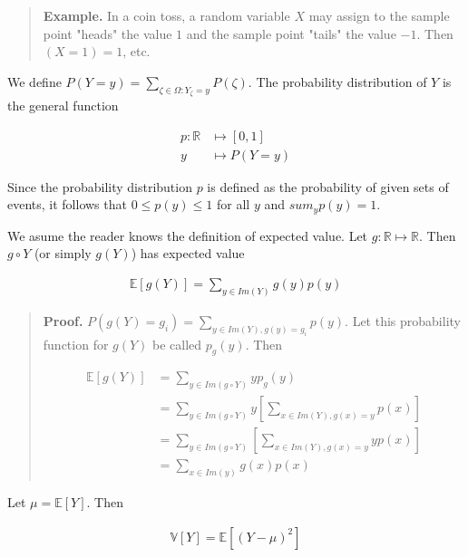 \documentclass[a4paper, 12pt]{article}
\begin{document}
\small
\begin{quote}

\textbf{Example.} In a coin toss, a random variable $X$ may assign to the sample
point "heads" the value $1$ and the sample point "tails" the value $-1$. Then
$(X = 1) = 1$, etc.

\end{quote}
\normalsize

We define $P(Y = y) = \sum_{\zeta \in \Omega : Y_{\zeta} = y} P(\zeta)$. The
probability distribution of $Y$ is the general function  

\begin{align*}
    p : \mathbb{R} &\mapsto [0, 1] \\ 
    y &\mapsto P(Y = y)
\end{align*}

Since the probability distribution $p$ is defined as the probability of given
sets of events, it follows that $0 \leq p(y) \leq 1$ for all $y$ and
$sum_{y}p(y) = 1$.

We asume the reader knows the definition of expected value. Let $g : \mathbb{R}
\mapsto \mathbb{R}$. Then $g \circ Y$ (or simply $g(Y)$) has expected value 

\begin{align*}
    \mathbb{E}\left[ g(Y) \right] = \sum_{y \in Im(Y)} g(y)p(y)
\end{align*}


\small
\begin{quote}

    \textbf{Proof.} $P(g(Y) = g_i) = \sum_{y \in Im(Y), g(y) = g_i} p(y)$. Let
    this probability function for $g(Y)$ be called $p_g(y)$. Then 

    \begin{align*}
        \mathbb{E}[g(Y)] &= \sum_{y \in Im(g \circ Y)} y p_g(y) \\ 
                         &= \sum_{y \in Im(g \circ Y)} y \left[ \sum_{x \in
                         Im(Y), g(x)= y} p(x) \right] \\ 
                         &= \sum_{y \in Im(g \circ Y)}  \left[ \sum_{x \in
                         Im(Y), g(x)= y} y p(x) \right] \\ 
                         &= \sum_{x \in Im(y)} g(x)p(x)
    \end{align*}

\end{quote}
\normalsize

\begin{definition}
    Let $\mu = \mathbb{E}\left[ Y \right] $. Then 

    \begin{align*}
        \mathbb{V}\left[ Y \right] = \mathbb{E} \left[ ( Y - \mu )^2 \right] 
    \end{align*}
\end{definition}
\end{document}
